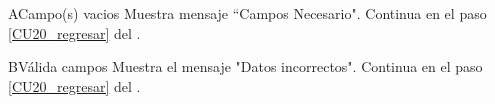 \begin{UCtrayectoriaA}{A}{Campo(s) vacios}
	\UCpaso Muestra mensaje “Campos Necesario".
	\UCpaso Continua en el paso \ref{CU20_regresar} del .
\end{UCtrayectoriaA}

\begin{UCtrayectoriaA}{B}{Válida campos}
	\UCpaso Muestra el mensaje "Datos incorrectos".
	\UCpaso Continua en el paso \ref{CU20_regresar} del .
\end{UCtrayectoriaA}


	


